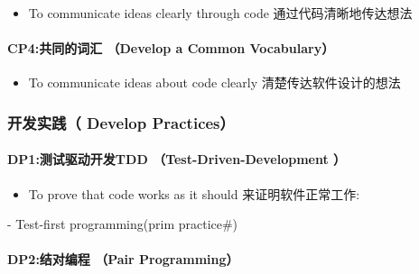 \begin{itemize}
\tightlist
\item
  To communicate ideas clearly through code 通过代码清晰地传达想法
\end{itemize}

\hypertarget{cp4ux5171ux540cux7684ux8bcdux6c47-develop-a-common-vocabulary}{%
\paragraph{CP4:共同的词汇 （Develop a Common
Vocabulary）}\label{cp4ux5171ux540cux7684ux8bcdux6c47-develop-a-common-vocabulary}}

\begin{itemize}
\tightlist
\item
  To communicate ideas about code clearly 清楚传达软件设计的想法
\end{itemize}

\hypertarget{ux5f00ux53d1ux5b9eux8df5-develop-practices}{%
\subsubsection{开发实践（ Develop
Practices）}\label{ux5f00ux53d1ux5b9eux8df5-develop-practices}}

\hypertarget{dp1ux6d4bux8bd5ux9a71ux52a8ux5f00ux53d1tdd-test-driven-development}{%
\paragraph{DP1:测试驱动开发TDD （Test-Driven-Development
）}\label{dp1ux6d4bux8bd5ux9a71ux52a8ux5f00ux53d1tdd-test-driven-development}}

\begin{itemize}
\tightlist
\item
  To prove that code works as it should 来证明软件正常工作:\\
\end{itemize}

\begin{description}
\tightlist
\item[]
- Test-first programming(prim practice\#)
\end{description}

\hypertarget{dp2ux7ed3ux5bf9ux7f16ux7a0b-pair-programming}{%
\paragraph{DP2:结对编程 （Pair
Programming）}\label{dp2ux7ed3ux5bf9ux7f16ux7a0b-pair-programming}}

